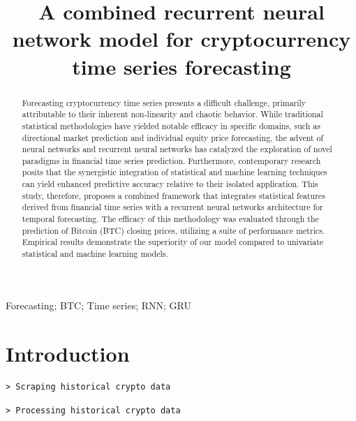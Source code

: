 \documentclass[]{interact}
\theoremstyle{plain}%
\theoremstyle{definition}
\theoremstyle{remark}
\begin{document}
\articletype{}

\title{A combined recurrent neural network model for cryptocurrency time
series forecasting}


\author{
}


\maketitle

\begin{abstract}
Forecasting cryptocurrency time series presents a difficult challenge,
primarily attributable to their inherent non-linearity and chaotic
behavior. While traditional statistical methodologies have yielded
notable efficacy in specific domains, such as directional market
prediction and individual equity price forecasting, the advent of neural
networks and recurrent neural networks has catalyzed the exploration of
novel paradigms in financial time series prediction. Furthermore,
contemporary research posits that the synergistic integration of
statistical and machine learning techniques can yield enhanced
predictive accuracy relative to their isolated application. This study,
therefore, proposes a combined framework that integrates statistical
features derived from financial time series with a recurrent neural
networks architecture for temporal forecasting. The efficacy of this
methodology was evaluated through the prediction of Bitcoin (BTC)
closing prices, utilizing a suite of performance metrics. Empirical
results demonstrate the superiority of our model compared to univariate
statistical and machine learning models.
\end{abstract}

\begin{keywords}
Forecasting; BTC; Time series; RNN; GRU
\end{keywords}

\section{Introduction}\label{introduction}

\begin{verbatim}
> Scraping historical crypto data
\end{verbatim}

\begin{verbatim}
> Processing historical crypto data
\end{verbatim}
\end{document}
